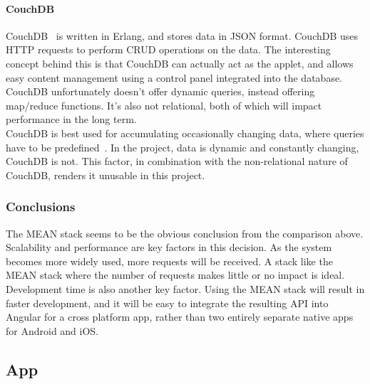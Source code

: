 \documentclass[draft,preprint,12pt,3p]{elsarticle}
\begin{document}
\paragraph{CouchDB}
CouchDB~\cite{couchdb} is written in Erlang, and stores data in JSON format. CouchDB uses HTTP requests to perform CRUD operations on the data. 
The interesting concept behind this is that CouchDB can actually act as the applet, and allows easy content management using a control panel integrated into the database.\\
CouchDB unfortunately doesn't offer dynamic queries, instead offering map/reduce functions. It's also not relational, both of which will impact performance in the long term.\\
CouchDB is best used for accumulating occasionally changing data, where queries have to be predefined~\cite{databasecomparison}. In the project, data is dynamic and constantly changing, CouchDB is not. This factor, in combination with the non-relational nature of CouchDB, renders it unusable in this project.

\subsubsection{Conclusions}
The MEAN stack seems to be the obvious conclusion from the comparison above. Scalability and performance are key factors in this decision. As the system becomes more widely used, more requests will be received. A stack like the MEAN stack where the number of requests makes little or no impact is ideal.\\
Development time is also another key factor. Using the MEAN stack will result in faster development, and it will be easy to integrate the resulting API into Angular for a cross platform app, rather than two entirely separate native apps for Android and iOS.

\subsection{App}
\end{document}
